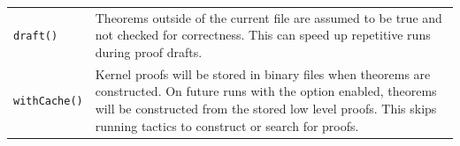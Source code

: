 \vspace{2em}
\begin{tabularx}{0.9\columnwidth}{|l|X|}
  \lstinline|draft()| & Theorems outside of the current file are assumed to be true and not checked for correctness. This can speed up repetitive runs during proof drafts.
  \\[4ex]
  \lstinline|withCache()| & Kernel proofs will be stored in binary files when theorems are constructed. On future runs with the option enabled, theorems will be constructed from the stored low level proofs. This skips running tactics to construct or search for proofs.\\

\end{tabularx}